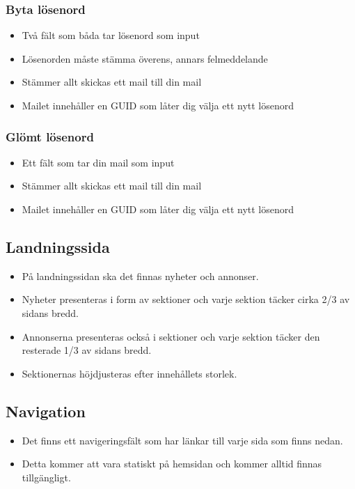 \documentclass[11pt, titlepage, oneside, a4paper]{article}	%
\begin{document}
\newpage
	\subsubsection*{Byta lösenord}
	\begin{itemize}
		\item Två fält som båda tar lösenord som input
		\item Lösenorden måste stämma överens, annars felmeddelande
		\item Stämmer allt skickas ett mail till din mail
		\item Mailet innehåller en GUID som låter dig välja ett nytt lösenord
	\end{itemize} 

	\subsubsection*{Glömt lösenord}
	\begin{itemize}
		\item Ett fält som tar din mail som input
		\item Stämmer allt skickas ett mail till din mail
		\item Mailet innehåller en GUID som låter dig välja ett nytt lösenord
	\end{itemize} 

\subsection{Landningssida}
	\begin{itemize}
		\item På landningssidan ska det finnas nyheter och annonser.
		\item Nyheter presenteras i form av sektioner och varje sektion täcker cirka 2/3 av sidans bredd.
		\item Annonserna presenteras också i sektioner och varje sektion täcker den resterade 1/3 av sidans bredd.
		\item Sektionernas höjdjusteras efter innehållets storlek.
	\end{itemize} 

\subsection{Navigation}
	\begin{itemize}
		\item Det finns ett navigeringsfält som har länkar till varje sida som finns nedan. 
		\item Detta kommer att vara statiskt på hemsidan och kommer alltid finnas tillgängligt.
	\end{itemize} 
\end{document}
